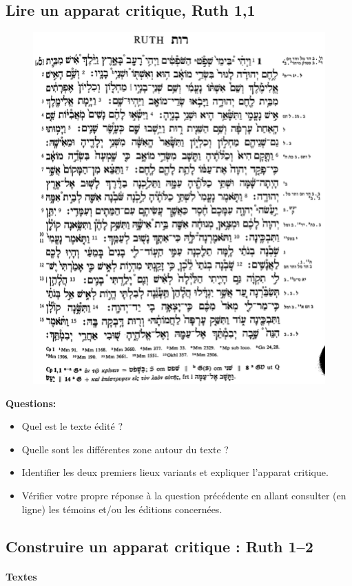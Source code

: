 \documentclass[11pt,a4paper]{article}
\begin{document}
\subsection{Lire un apparat critique, Ruth 1,1}
\begin{figure}[!h]
    \centering
    \includegraphics[width=.8\linewidth]{img/Ruth_1_1.png}
\end{figure}
\textbf{Questions:}
    \begin{itemize}
        \item Quel est le texte édité ?
        \item Quelle sont les différentes zone autour du texte ?
        \item Identifier les deux premiers lieux variants et expliquer l'apparat critique.
        \item Vérifier votre propre réponse à la question précédente en allant consulter (en ligne) les témoins et/ou les éditions concernées.
    \end{itemize}
\newpage
\subsection{Construire un apparat critique : Ruth 1--2}
\paragraph{Textes}~\\
\end{document}
